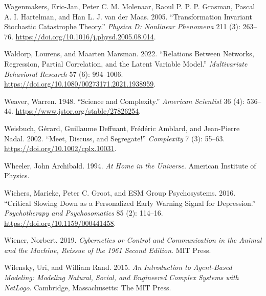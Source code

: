 \documentclass[
  a4paper,
  DIV=11,
  numbers=noendperiod,
  oneside]{scrreprt}
\newlength{\cslhangindent}
\newlength{\cslentryspacingunit} %
\newenvironment{CSLReferences}[2] %
 {%
  \setlength{\parindent}{0pt}
  \ifodd #1
  \let\oldpar\par
  \def\par{\hangindent=\cslhangindent\oldpar}
  \fi
  \setlength{\parskip}{#2\cslentryspacingunit}
 }%
 {}
\begin{document}
\begin{CSLReferences}{1}{0}
\leavevmode{}%
Wagenmakers, Eric-Jan, Peter C. M. Molenaar, Raoul P. P. P. Grasman,
Pascal A. I. Hartelman, and Han L. J. van der Maas. 2005.
{``Transformation Invariant Stochastic Catastrophe Theory.''}
\emph{Physica D: Nonlinear Phenomena} 211 (3): 263--76.
\url{https://doi.org/10.1016/j.physd.2005.08.014}.

\leavevmode{}%
Waldorp, Lourens, and Maarten Marsman. 2022. {``Relations Between
{Networks}, {Regression}, {Partial Correlation}, and the {Latent
Variable Model}.''} \emph{Multivariate Behavioral Research} 57 (6):
994--1006. \url{https://doi.org/10.1080/00273171.2021.1938959}.

\leavevmode{}%
Weaver, Warren. 1948. {``Science and {Complexity}.''} \emph{American
Scientist} 36 (4): 536--44. \url{https://www.jstor.org/stable/27826254}.

\leavevmode{}%
Weisbuch, Gérard, Guillaume Deffuant, Frédéric Amblard, and Jean-Pierre
Nadal. 2002. {``Meet, Discuss, and Segregate!''} \emph{Complexity} 7
(3): 55--63. \url{https://doi.org/10.1002/cplx.10031}.

\leavevmode{}%
Wheeler, John Archibald. 1994. \emph{At {Home} in the {Universe}}.
{American Institute of Physics}.

\leavevmode{}%
Wichers, Marieke, Peter C. Groot, and ESM Group Psychosystems. 2016.
{``Critical {Slowing Down} as a {Personalized Early Warning Signal} for
{Depression}.''} \emph{Psychotherapy and Psychosomatics} 85 (2):
114--16. \url{https://doi.org/10.1159/000441458}.

\leavevmode{}%
Wiener, Norbert. 2019. \emph{Cybernetics or {Control} and
{Communication} in the {Animal} and the {Machine}, {Reissue} of the 1961
Second Edition}. {MIT Press}.

\leavevmode{}%
Wilensky, Uri, and William Rand. 2015. \emph{An Introduction to
Agent-Based Modeling: Modeling Natural, Social, and Engineered Complex
Systems with {NetLogo}}. {Cambridge, Massachusetts}: {The MIT Press}.


\end{CSLReferences}
\end{document}
